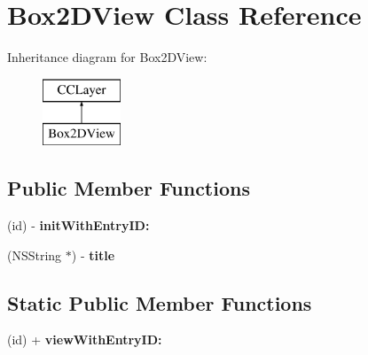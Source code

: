 \hypertarget{interface_box2_d_view}{\section{Box2\-D\-View Class Reference}
\label{interface_box2_d_view}
}
Inheritance diagram for Box2\-D\-View\-:\begin{figure}[H]
\begin{center}
\leavevmode
\includegraphics[height=2.000000cm]{interface_box2_d_view}
\end{center}
\end{figure}
\subsection*{Public Member Functions}
\begin{DoxyCompactItemize}
\item 
\hypertarget{interface_box2_d_view_a445d2ac2d2dec1bff1012995b8d7b1ee}{(id) -\/ {\bfseries init\-With\-Entry\-I\-D\-:}}\label{interface_box2_d_view_a445d2ac2d2dec1bff1012995b8d7b1ee}

\item 
\hypertarget{interface_box2_d_view_a1dfa2a69774664fcb7f523df642d5426}{(N\-S\-String $\ast$) -\/ {\bfseries title}}\label{interface_box2_d_view_a1dfa2a69774664fcb7f523df642d5426}

\end{DoxyCompactItemize}
\subsection*{Static Public Member Functions}
\begin{DoxyCompactItemize}
\item 
\hypertarget{interface_box2_d_view_ac0b6d9f753e0111fcdb35853736835e0}{(id) + {\bfseries view\-With\-Entry\-I\-D\-:}}\label{interface_box2_d_view_ac0b6d9f753e0111fcdb35853736835e0}

\end{DoxyCompactItemize}
